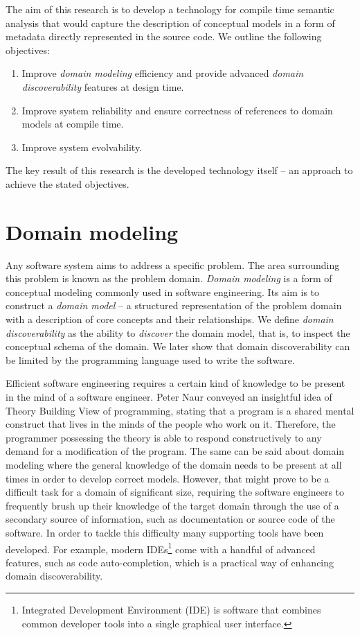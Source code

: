 The aim of this research is to develop a technology for compile time semantic analysis that would capture the description of conceptual models in a form of metadata directly represented in the source code. 
We outline the following objectives:
\begin{enumerate}
    \item Improve \textit{domain modeling} efficiency and provide advanced \textit{domain discoverability} features at design time.
    \item Improve system reliability and ensure correctness of references to domain models at compile time.
    \item Improve system evolvability.
\end{enumerate}

The key result of this research is the developed technology itself -- an approach to achieve the stated objectives.

\section{Domain modeling}
Any software system aims to address a specific problem.
The area surrounding this problem is known as the problem domain. \textit{Domain modeling} is a form of conceptual modeling commonly used in software engineering.
Its aim is to construct a \textit{domain model} -- a structured representation of the problem domain with a description of core concepts and their relationships.
We define \textit{domain discoverability} as the ability to \textit{discover} the domain model, that is, to inspect the conceptual schema of the domain.
We later show that domain discoverability can be limited by the programming language used to write the software.

\n

Efficient software engineering requires a certain kind of knowledge to be present in the mind of a software engineer. 
Peter Naur \cite{naur} conveyed an insightful idea of Theory Building View of programming, stating that a program is a shared mental construct that lives in the minds of the people who work on it.
Therefore, the programmer possessing the theory is able to respond constructively to any demand for a modification of the program.
The same can be said about domain modeling where the general knowledge of the domain needs to be present at all times in order to develop correct models.
However, that might prove to be a difficult task for a domain of significant size, requiring the software engineers to frequently brush up their knowledge of the target domain through the use of a secondary source of information, such as documentation or source code of the software.
In order to tackle this difficulty many supporting tools have been developed. For example, modern IDEs\footnote{Integrated Development Environment (IDE) is software that combines common developer tools into a single graphical user interface.} come with a handful of advanced features, such as code auto-completion, which is a practical way of enhancing domain discoverability.


